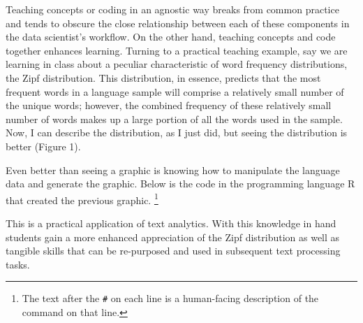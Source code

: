 \documentclass[]{book}
\newenvironment{Shaded}{\begin{snugshade}}{\end{snugshade}}
\newcommand{\CommentTok}[1]{\textcolor[rgb]{0.56,0.35,0.01}{\textit{#1}}}
\newcommand{\DataTypeTok}[1]{\textcolor[rgb]{0.13,0.29,0.53}{#1}}
\newcommand{\DecValTok}[1]{\textcolor[rgb]{0.00,0.00,0.81}{#1}}
\newcommand{\KeywordTok}[1]{\textcolor[rgb]{0.13,0.29,0.53}{\textbf{#1}}}
\newcommand{\NormalTok}[1]{#1}
\newcommand{\OperatorTok}[1]{\textcolor[rgb]{0.81,0.36,0.00}{\textbf{#1}}}
\newcommand{\OtherTok}[1]{\textcolor[rgb]{0.56,0.35,0.01}{#1}}
\newcommand{\StringTok}[1]{\textcolor[rgb]{0.31,0.60,0.02}{#1}}
\let\rmarkdownfootnote\footnote%
\def\footnote{\protect\rmarkdownfootnote}
\begin{document}
Teaching concepts or coding in an agnostic way breaks from common practice and tends to obscure the close relationship between each of these components in the data scientist's workflow. On the other hand, teaching concepts and code together enhances learning. Turning to a practical teaching example, say we are learning in class about a peculiar characteristic of word frequency distributions, the Zipf distribution. This distribution, in essence, predicts that the most frequent words in a language sample will comprise a relatively small number of the unique words; however, the combined frequency of these relatively small number of words makes up a large portion of all the words used in the sample. Now, I can describe the distribution, as I just did, but seeing the distribution is better (Figure 1).

Even better than seeing a graphic is knowing how to manipulate the language data and generate the graphic. Below is the code in the programming language R that created the previous graphic. \footnote{The text after the \texttt{\#} on each line is a human-facing description of the command on that line.}

\begin{Shaded}
\end{Shaded}

This is a practical application of text analytics. With this knowledge in hand students gain a more enhanced appreciation of the Zipf distribution as well as tangible skills that can be re-purposed and used in subsequent text processing tasks.
\end{document}
